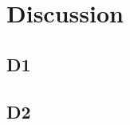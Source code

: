 \documentclass[11pt]{article}
\begin{document}
%
%
%
\section{Discussion}
\subsection{D1}
\subsection{D2}


\end{document}
